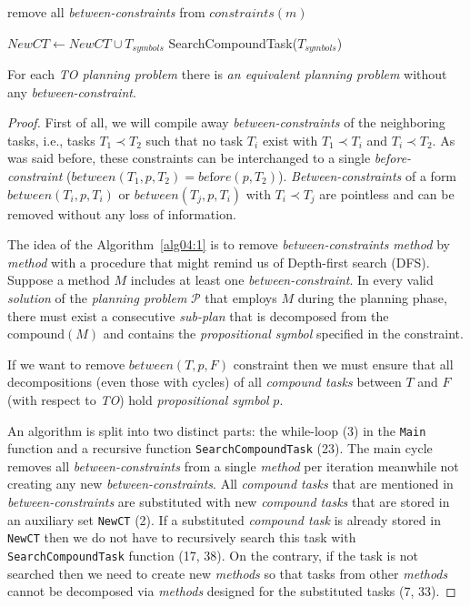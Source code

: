 \begin{algorithm}
\begin{algorithmic}[1]
                \State remove all \emph{between-constraints} from $constraints(m)$

                    \State $NewCT \gets NewCT \cup T_{symbols}$
                    \State SearchCompoundTask($T_{symbols}$)
                \EndFor
            \EndFor
        \EndProcedure
    \end{algorithmic}
\end{algorithm}

\begin{thm}\label{thm04:9}
    For each \emph{TO planning problem} there is \emph{an equivalent planning problem} without any \emph{between-constraint}.
\end{thm}
\begin{proof}
    First of all, we will compile away \emph{between-constraints} of the neighboring tasks, i.e., tasks $T_1 \prec T_2$ such that no task $T_i$ exist with $T_1 \prec T_i$ and $T_i \prec T_2$. As was said before, these constraints can be interchanged to a single \emph{before-constraint} ($between(T_1, p, T_2) = be\text{f}ore(p, T_2)$). \emph{Between-constraints} of a form $between(T_i, p, T_i)$ or $between(T_j, p, T_i)$ with $T_i \prec T_j$ are pointless and can be removed without any loss of information.
    
    The idea of the Algorithm~\ref{alg04:1} is to remove \emph{between-constraints} \emph{method} by \emph{method} with a procedure that might remind us of Depth-first search (DFS). Suppose a method \( M \) includes at least one \emph{between-constraint}. In every valid \emph{solution} of the \emph{planning problem} \(\mathcal{P}\) that employs \( M \) during the planning phase, there must exist a consecutive \emph{sub-plan} that is decomposed from the \( \text{compound}(M) \) and contains the \emph{propositional symbol} specified in the constraint.

    If we want to remove $between(T, p, F)$ constraint then we must ensure that all decompositions (even those with cycles) of all \emph{compound tasks} between $T$ and $F$ (with respect to \emph{TO}) hold \emph{propositional symbol} $p$.
    
    An algorithm is split into two distinct parts: the while-loop (3) in the \texttt{Main} function and a recursive function \texttt{SearchCompoundTask} (23). The main cycle removes all \emph{between-constraints} from a single \emph{method} per iteration meanwhile not creating any new \emph{between-constraints}. All \emph{compound tasks} that are mentioned in \emph{between-constraints} are substituted with new \emph{compound tasks} that are stored in an auxiliary set \texttt{NewCT} (2). If a substituted \emph{compound task} is already stored in \texttt{NewCT} then we do not have to recursively search this task with \texttt{SearchCompoundTask} function (17, 38). On the contrary, if the task is not searched then we need to create new \emph{methods} so that tasks from other \emph{methods} cannot be decomposed via \emph{methods} designed for the substituted tasks (7, 33).


\end{proof}

